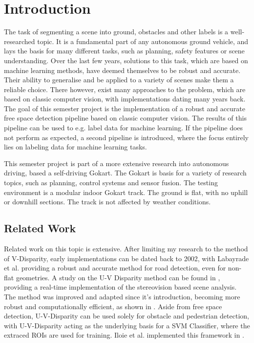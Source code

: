 
\chapter{Introduction}
\label{chp:Introduction}

The task of segmenting a scene into ground, obstacles and other labels is a well-researched topic. It is a fundamental part of any autonomous ground vehicle, and lays the basis for many different tasks, such as planning, safety features or scene understanding. Over the last few years, solutions to this task, which are based on machine learning methods, have deemed themselves to be robust and accurate. Their ability to generalise and be applied to a variety of scenes make them a reliable choice. There however, exist many approaches to the problem, which are based on classic computer vision, with implementations dating many years back. \newline
The goal of this semester project is the implementation of a robust and accurate free space detection pipeline based on classic computer vision. The results of this pipeline can be used to e.g. label data for machine learning. If the pipeline does not perform as expected, a second pipeline is introduced, where the focus entirely lies on labeling data for machine learning tasks. 

This semester project is part of a more extensive research into autonomous driving, based a self-driving Gokart. The Gokart is basis for a variety of research topics, such as planning, control systems and sensor fusion. The testing environment is a modular indoor Gokart track. The ground is flat, with no uphill or downhill sections. The track is not affected by weather conditions. 
\newline


\section{Related Work}
Related work on this topic is extensive. After limiting my research to the method of V-Disparity, early implementations can be dated back to 2002, with Labayrade et al. \cite{V-disparity_nonflat} providing a robust and accurate method for road detection, even for non-flat geometries. A study on the U-V Disparity method can be found in \cite{Hu2005}, providing a real-time implementation of the stereovision based scene analysis. The method was improved and adapted since it's introduction, becoming more robust and computationally efficient, as shown in \cite{Kakegawa2018}. Aside from free space detection, U-V-Disparity can be used solely for obstacle and pedestrian detection, with U-V-Disparity acting as the underlying basis for a SVM Classifier, where the extraced ROIs are used for training. Iloie et al. implemented this framework in \cite{Iloie2014}.

